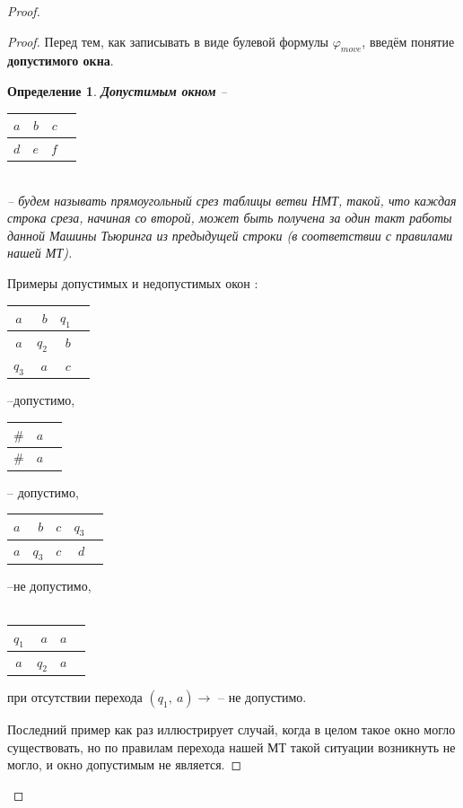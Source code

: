 \documentclass[a4paper,12pt]{article}
\newtheorem{definition}{Определение}
\begin{document}
\begin{proof}
\begin{proof}
        Перед тем, как записывать в виде булевой формулы $\varphi_{move}$, введём понятие \textbf{допустимого окна}.
        \begin{definition}
            \textbf{Допустимым окном} -- \begin{tabular}{|c|*{3}{r|}|}
        \hline
        $a$ & $b$ & $c$ \\
        \hline
        $d$ & $e$ & $f$\\
        \hline
        \end{tabular}\\ -- будем называть прямоугольный срез таблицы ветви НМТ, такой, что каждая строка среза, начиная со второй, может быть получена за один такт работы данной Машины Тьюринга из предыдущей строки (в соответствии с правилами нашей МТ).
        \end{definition}
        Примеры допустимых и недопустимых окон :\\
        \begin{tabular}{|c|*{3}{r|}|}
        \hline
        $a $& $b$ & $q_1$ \\
        \hline
        $a$ & $q_2$ & $b$\\
        \hline
        $q_3$ & $a$ & $c$\\
        \hline
        \end{tabular} --допустимо,
        \begin{tabular}{|c|*{2}{r|}|}
        \hline
        $\#$ & $a$ \\
        \hline
        $\#$ & $a$\\
        \hline
        \end{tabular} -- допустимо,
        \begin{tabular}{|c|*{4}{r|}|}
        \hline
        $a$ & $b$ & $c$ & $q_3$ \\
        \hline
        $a$ & $q_3$ & $c$ & $d$\\ 
        \hline
        \end{tabular}--не допустимо,
        \ \\
        \ \\
        \begin{tabular}{|c|*{3}{r|}|}
        \hline
        $q_1$ & $a$& $a$ \\
        \hline
        $a$ & $q_2$ & $a$\\ 
        \hline
        \end{tabular} при отсутствии перехода $(q_1,\ a) \to$ -- не допустимо.
        
        Последний пример как раз иллюстрирует случай, когда в целом такое окно могло существовать, но по правилам перехода нашей МТ такой ситуации возникнуть не могло, и окно допустимым не является.
        

\end{proof}
\end{proof}
\end{document}
